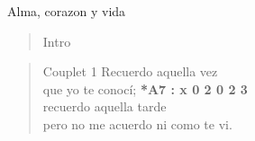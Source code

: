 \begin{song}[vals]{Alma, corazon y vida}
\begin{verse}{Intro}
	 \hspace{0.4cm} \hspace{0.4cm} \hspace{0.4cm} \hspace{0.4cm} \hspace{0.4cm}\hspace{0.4cm}  \hspace{0.4cm}
\end{verse}

\begin{verse}{Couplet 1}
	\hspace{0.6cm}Recuerdo aquella vez\\
	\hspace{0.6cm}que yo te conoc\'i; \hspace{7cm} \small{\textbf{*A7 : x 0 2 0 2 3}}\\
	\hspace*{0.6cm}recuerdo aquella tarde\\
	\hspace*{0.6cm}pero no me acuerdo ni como te vi.\hspace{0.5cm}
\end{verse}


\end{song}
